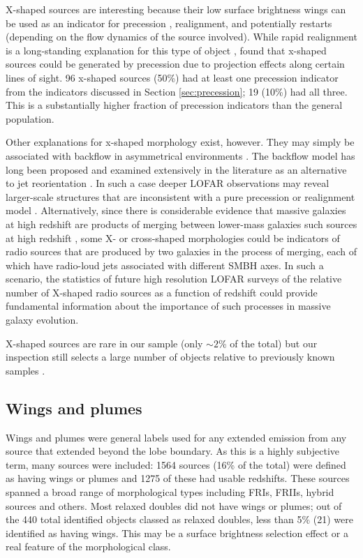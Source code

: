 \documentclass{aa}
\begin{document}
X-shaped sources are interesting because their low surface brightness wings can be used as an indicator for precession \citep{ekers78}, realignment, and potentially restarts (depending on the flow dynamics of the source involved). While rapid realignment is a long-standing explanation for this type of object \citep{merritt02}, \cite{horton20b} found that x-shaped sources could be generated by precession due to projection effects along certain lines of sight. 96 x-shaped sources (50\%) had at least one precession indicator from the indicators discussed in Section \ref{sec:precession}; 19 (10\%) had all three. This is a substantially higher fraction of precession indicators than the general population.

Other explanations for x-shaped morphology exist, however. They may simply be associated with backflow in asymmetrical environments \citep[e.g.,][]{gourab22, cotton20,dennetthorpe02}. The backflow model has long been proposed and examined extensively in the literature as an alternative to jet reorientation \citep{leahy84,dennetthorpe02}. In such a case deeper LOFAR observations may reveal larger-scale structures that are inconsistent with a pure precession or realignment model \citep{hardcastle19}. Alternatively, since there is considerable evidence that massive galaxies at high redshift are products of merging between lower-mass galaxies such sources at high redshift \citep[e.g.][]{barthel88}, some X- or cross-shaped morphologies could be indicators of radio sources that are produced by two galaxies in the process of merging, each of which have radio-loud jets associated with different SMBH axes. In such a scenario, the statistics of future high resolution LOFAR surveys of the relative number of X-shaped radio sources as a function of redshift could provide fundamental information about the importance of such processes in massive galaxy evolution.

X-shaped sources are rare in our sample (only $\sim 2$\% of the total) but our inspection still selects a large number of objects relative to previously known samples \citep[e.g.][]{cheung07}.

\subsection{Wings and plumes}
Wings and plumes were general labels used for any extended emission from any source that extended beyond the lobe boundary. As this is a highly subjective term, many sources were included: 1564 sources (16\% of the total) were defined as having wings or plumes and 1275 of these had usable redshifts. These sources spanned a broad range of morphological types including FRIs, FRIIs, hybrid sources and others. Most relaxed doubles did not have wings or plumes; out of the 440 total identified objects classed as relaxed doubles, less than 5\% (21) were identified as having wings. This may be a surface brightness selection effect or a real feature of the morphological class.
\end{document}
